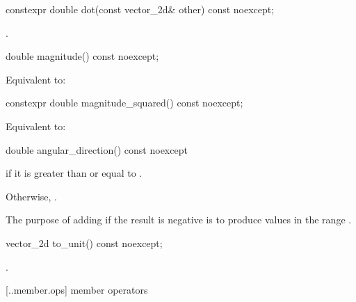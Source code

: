 %
\begin{itemdecl}
constexpr double dot(const vector_2d& other) const noexcept;
\end{itemdecl}
\begin{itemdescr}
\pnum
\returns
{}.
\end{itemdescr}

%
\begin{itemdecl}
double magnitude() const noexcept;
\end{itemdecl}
\begin{itemdescr}
\pnum
\returns
Equivalent to: 
\end{itemdescr}

%
\begin{itemdecl}
constexpr double magnitude_squared() const noexcept;
\end{itemdecl}
\begin{itemdescr}
\pnum
\returns
Equivalent to: 
\end{itemdescr}

%
\begin{itemdecl}
double angular_direction() const noexcept
\end{itemdecl}
\begin{itemdescr}
\pnum
\returns
{} if it is greater than or equal to .

\pnum
Otherwise, . 

\pnum
\begin{note}
The purpose of adding  if the result is negative is to produce values in the range .
\end{note}
\end{itemdescr}

%
\begin{itemdecl}
vector_2d to_unit() const noexcept;
\end{itemdecl}
\begin{itemdescr}
\pnum
\returns
{}.
\end{itemdescr}

 [\iotwod.\vectortwod.member.ops] { member operators}

